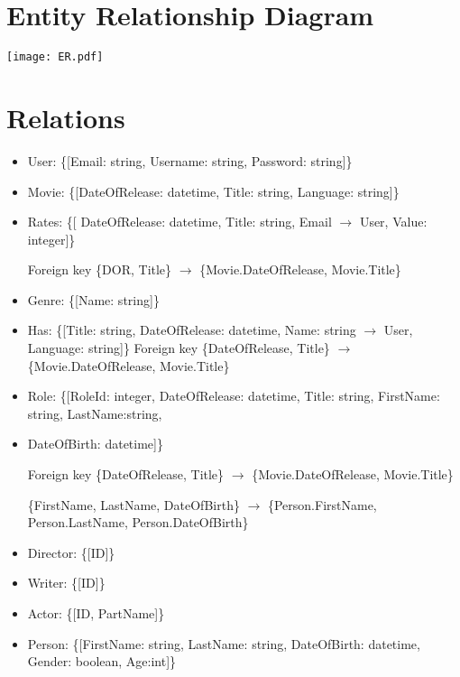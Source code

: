 \section{Entity Relationship Diagram}

\texttt{[image: ER.pdf]}

\section{Relations}
\begin{itemize}
\item User: \{[Email: string, Username: string, Password: string]\}

\item Movie: \{[DateOfRelease: datetime, Title: string, Language: string]\}

\item Rates: \{[ DateOfRelease: datetime, Title: string, Email $ \rightarrow $ User, Value: integer]\}

Foreign key \{DOR, Title\}  $ \rightarrow $ \{Movie.DateOfRelease, Movie.Title\}

\item Genre: \{[Name: string]\}

\item Has: \{[Title: string, DateOfRelease: datetime, Name: string $ \rightarrow $ User, Language: string]\}
	Foreign key \{DateOfRelease, Title\} $ \rightarrow $ \{Movie.DateOfRelease, Movie.Title\}

\item Role: \{[RoleId: integer, DateOfRelease: datetime, Title: string, FirstName: string, LastName:string,

\item DateOfBirth: datetime]\}

Foreign key \{DateOfRelease, Title\} $ \rightarrow $ \{Movie.DateOfRelease, Movie.Title\}

\{FirstName, LastName, DateOfBirth\} $ \rightarrow $ \{Person.FirstName, Person.LastName, Person.DateOfBirth\}

\item Director: \{[ID]\}

\item Writer: \{[ID]\}

\item Actor: \{[ID, PartName]\}

\item Person: \{[FirstName: string, LastName: string, DateOfBirth: datetime, 
Gender: boolean, Age:int]\}


\end{itemize}
